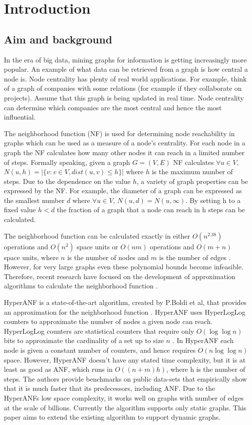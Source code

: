 \chapter{Introduction}

\section{Aim and background}
In the era of big data, mining graphs for information is getting increasingly more popular. An example of what data can be retrieved from a graph is how central a node is. Node centrality has plenty of real world applications. For example, think of a graph of companies with some relations (for example if they collaborate on projects). Assume that this graph is being updated in real time. Node centrality can determine which companies are the most central and hence the most influential. 

The neighborhood function (NF) is used for determining node reachability in graphs which can be used as a measure of a node's centrality. For each node in a graph the NF calculates how many other nodes it can reach in a limited number of steps. Formally speaking, given a graph $G = (V,E)$ NF calculates $\forall u \in V,$ $N(u,h) = |\{v : v \in V, dist(u,v) \leq h \}|$ where $h$ is the maximum number of steps. Due to the dependence on the value $h$, a variety of graph properties can be expressed by the NF. For example, the diameter of a graph can be expressed as the smallest number $d$ where $ \forall u \in V$, $N(u,d) = N(u,\infty)$. By setting h to a fixed value $h < d$ the fraction of a graph that a node can reach in h steps can be calculated.

The neighborhood function can be calculated exactly in either $O(n^{2.38})$ operations and $O(n^2)$ space units or $O(nm)$ operations and $O(m + n)$ space units, where $n$ is the number of nodes and $m$ is the number of edges \cite{Palmer01}. However, for very large graphs even these polynomial bounds become infeasible. Therefore, recent research have focused on the development of approximation algorithms to calculate the neighborhood function \cite{Palmer01,anf,hyperanf}. 

HyperANF is a state-of-the-art algorithm, created by P.Boldi et al, that provides an approximation for the neighborhood function \cite{hyperanf}. HyperANF uses HyperLogLog counters to approximate the number of nodes a given node can reach. HyperLogLog counters are statistical counters that require only $O( \log\log n)$ bits to approximate the cardinality of a set up to size $n$ \cite{hyperloglog}. In HyperANF each node is given a constant number of counters, and hence requires $O(n \log\log n)$ space. However, HyperANF doesn't have any stated time complexity, but it is at least as good as ANF, which runs in $O((n+m)h)$, where h is the number of steps. The authors provide benchmarks on public data-sets that empirically show that it is much faster that its predecessors, including ANF. Due to the HyperANFs low space complexity, it works well on graphs with number of edges at the scale of billions. Currently the algorithm supports only static graphs. This paper aims to extend the existing algorithm to support dynamic graphs.

